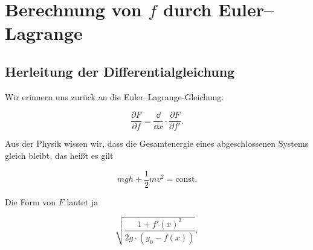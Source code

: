


\chapter{Berechnung von $f$ durch Euler--Lagrange}\label{ch6}

\section{Herleitung der Differentialgleichung}

Wir erinnern uns zurück an die Euler--Lagrange-Gleichung:

$$
\frac{\partial F}{\partial f} = \frac{\dd}{\dd x}\cdot \frac{\partial F}{\partial f'}.
$$

Aus der Physik wissen wir, dass die Gesamtenergie eines abgeschlossenen Systems gleich bleibt, das heißt es gilt

\begin{equation}
 mgh + \frac{1}{2} mv^2 = \text{const.}
\end{equation}



Die Form von $F$ lautet ja

$$
\sqrt{\frac{1+f'(x)^2}{2g \cdot (y_0 - f(x))}},
$$

